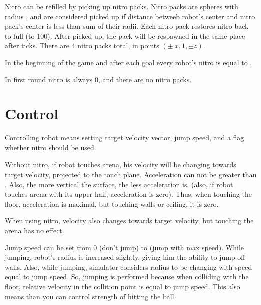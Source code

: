Nitro can be refilled by picking up nitro packs.
Nitro packs are spheres with radius , and are considered picked up
if distance betweeb robot's center and nitro pack's center is less than sum of their radii.
Each nitro pack restores nitro back to full (to $100$).
After picked up, the pack will be respawned in the same place after  ticks.
There are $4$ nitro packs total, in points $(\pm\ x, 1, \pm z)$.

In the beginning of the game and after each goal every robot's nitro is equal to .

In first round nitro is always $0$, and there are no nitro packs.

\section{Control}

Controlling robot means setting target velocity vector, jump speed, and a flag whether nitro should be used.

Without nitro, if robot touches arena,
his velocity will be changing towards target velocity, projected to the touch plane.
Acceleration can not be greater than .
Also, the more vertical the surface, the less acceleration is.
(also, if robot touches arena with its upper half, acceleration is zero).
Thus, when touching the floor, acceleration is maximal, but touching walls or ceiling, it is zero.

When using nitro, velocity also changes towards target velocity, but touching the arena has no effect.

Jump speed can be set from $0$ (don't jump) to  (jump with max speed).
While jumping, robot's radius is increased slightly, giving him the ability to jump off walls.
Also, while jumping, simulator considers radius to be changing with speed equal to jump speed.
So, jumping is performed because when colliding with the floor, relative velocity in the collition point is equal to jump speed.
This also means than you can control strength of hitting the ball.